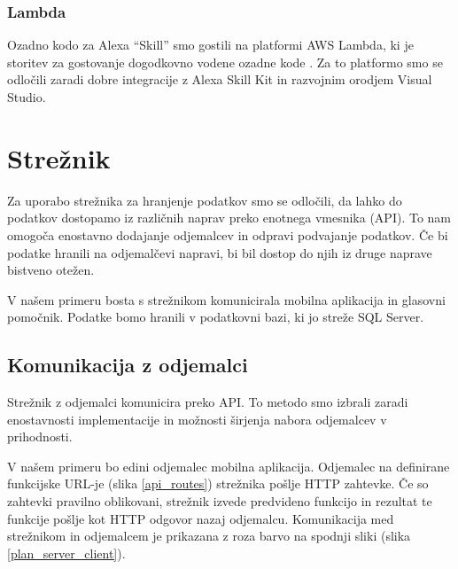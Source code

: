 \documentclass[a4paper, 12pt]{book}
\begin{document}
\subsubsection{Lambda}

Ozadno kodo za Alexa \enquote{Skill} smo gostili na platformi AWS Lambda, ki je storitev za gostovanje dogodkovno vodene ozadne kode \cite{lambda}.
Za to platformo smo se odločili zaradi dobre integracije z Alexa Skill Kit in razvojnim orodjem Visual Studio.

\section{Strežnik}

Za uporabo strežnika za hranjenje podatkov smo se odločili, da lahko do podatkov dostopamo iz različnih naprav preko enotnega vmesnika (API).
To nam omogoča enostavno dodajanje odjemalcev in odpravi podvajanje podatkov.
Če bi podatke hranili na odjemalčevi napravi, bi bil dostop do njih iz druge naprave bistveno otežen.

V našem primeru bosta s strežnikom komunicirala mobilna aplikacija in glasovni pomočnik.
Podatke bomo hranili v podatkovni bazi, ki jo streže SQL Server.

\subsection{Komunikacija z odjemalci}

Strežnik z odjemalci komunicira preko API.
To metodo smo izbrali zaradi enostavnosti implementacije in možnosti širjenja nabora odjemalcev v prihodnosti.

V našem primeru bo edini odjemalec mobilna aplikacija.
Odjemalec na definirane funkcijske URL-je (slika \ref{api_routes}) strežnika pošlje HTTP zahtevke.
Če so zahtevki pravilno oblikovani, strežnik izvede predvideno funkcijo in rezultat te funkcije pošlje kot HTTP odgovor nazaj odjemalcu.
Komunikacija med strežnikom in odjemalcem je prikazana z roza barvo na spodnji sliki (slika \ref{plan_server_client}).
\end{document}
